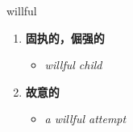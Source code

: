 
\begin{frame}
{\huge willful}
\begin{center}
\begin{enumerate}\Large
  \item \textbf{固执的，倔强的}
  \begin{itemize}
    \item \em{\Large{willful child}}
  \end{itemize}
  \item \textbf{故意的}
  \begin{itemize}
    \item \em{\Large{a willful attempt}}
  \end{itemize}
\end{enumerate}
\end{center}
\end{frame}
